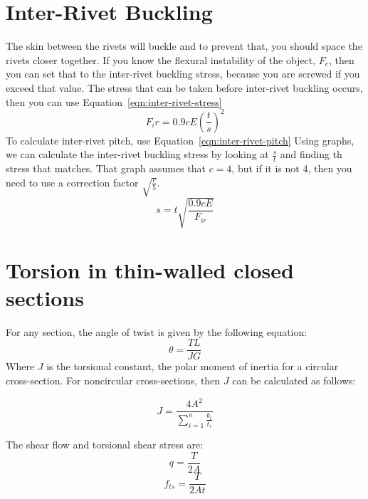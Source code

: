 \documentclass{article}
\begin{document}
\section{Inter-Rivet Buckling}
The skin between the rivets will buckle and to prevent that, you should space the rivets closer together.
If you know the flexural instability of the object, $F_c$, then you can set that to the inter-rivet buckling stress, because you are screwed if you exceed that value.
The stress that can be taken before inter-rivet buckling occurs, then you can use Equation~\ref{eqn:inter-rivet-stress}
\begin{equation}\label{eqn:inter-rivet-stress}
    F_ir = 0.9cE\left(\frac{t}{s}\right) ^ 2
\end{equation}
To calculate inter-rivet pitch, use Equation~\ref{eqn:inter-rivet-pitch}
Using graphs, we can calculate the inter-rivet buckling stress by looking at $\frac{s}{t}$ and finding th stress that matches.
That graph assumes that $c=4$, but if it is not 4, then you need to use a correction factor $\sqrt{\frac{c}{5}}$.
\begin{equation}\label{eqn:inter-rivet-pitch}
   s = t\sqrt{\frac{0.9cE}{F_{ir}}} 
\end{equation}
\section{Torsion in thin-walled closed sections}
For any section, the angle of twist is given by the following equation:
\begin{equation}
\theta = \frac{TL}{JG}
\end{equation}
Where $J$ is the torsional constant, the polar moment of inertia for a circular cross-section.
For noncircular cross-sections, then $J$ can be calculated as follows:

\begin{equation}
    J = \frac{4A^2}{\sum_{i=1}^n\frac{b_i}{t_i}}
\end{equation}

The shear flow and torsional shear stress are:
\begin{equation}
    q = \frac{T}{2A}
\end{equation}
\begin{equation}
    f_{ts} = \frac{T}{2At}
\end{equation}
\end{document}
